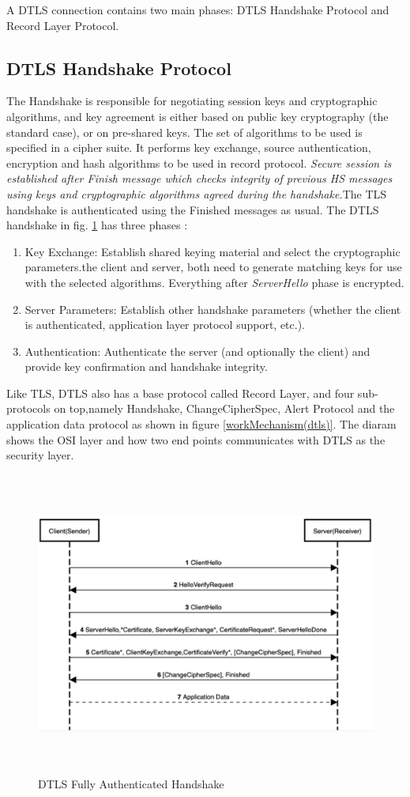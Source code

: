 A DTLS connection contains two main phases: DTLS Handshake Protocol and Record Layer Protocol.



\subsection{DTLS Handshake Protocol}
The Handshake is responsible for negotiating session keys and cryptographic algorithms, and key agreement is either based on public key cryptography (the standard case), or on pre-shared keys. The set of algorithms to be used is specified in a cipher suite. It performs key exchange, source authentication, encryption and hash algorithms to be used in record protocol. \textit{Secure session is established after Finish message which checks integrity of previous HS messages using keys and cryptographic algorithms agreed during the handshake.}The TLS handshake is authenticated using the Finished messages as usual.
The DTLS handshake in fig. \ref{dtls(auth)} has three phases  : 
\begin{enumerate}
        \item Key Exchange: Establish shared keying material and select the cryptographic parameters.the client and server, both need to generate matching keys for use with the selected algorithms.  Everything after \textit{ServerHello} phase is encrypted.
        \item Server Parameters: Establish other handshake parameters (whether the client is authenticated, application layer protocol support, etc.).
        \item Authentication: Authenticate the server (and optionally the client) and provide key confirmation and handshake integrity.
\end{enumerate}
Like TLS, DTLS also has a base protocol called Record Layer,  and four sub-protocols on top,namely Handshake,  ChangeCipherSpec,  Alert Protocol and the application data protocol as shown in figure \ref{workMechanism(dtls)}. The diaram shows the OSI layer and how two end points communicates with DTLS as the security layer.
\begin{figure}[H]
\centering
    \includegraphics[height=10cm,width=12cm]{figures/dtls(auth).png}
    \caption{DTLS Fully Authenticated Handshake}
    \label{dtls(auth)}
\end{figure}

